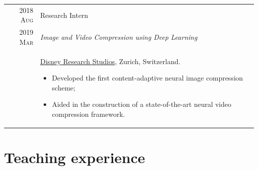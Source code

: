 \documentclass[a4paper,11pt]{article}
\begin{document}
\begin{tabular}{r|p{13cm}}
      \textsc{2018 Aug} & Research Intern \\
      \textsc{2019 Mar} & \emph{Image and Video Compression using Deep Learning} \\
				& \footnotesize{\href{https://studios.disneyresearch.com/}{Disney Research Studios}, Zurich, Switzerland.}
        \begin{itemize}[leftmargin=*,noitemsep]
          \item \footnotesize{
            Developed the first content-adaptive neural image compression scheme;}
          \item  \footnotesize{
            Aided in the construction of a state-of-the-art neural video compression framework.}
          \end{itemize} \vspace*{-\baselineskip}

    \end{tabular}

  

  \vspace{18pt}

  \section{Teaching experience}
\end{document}
